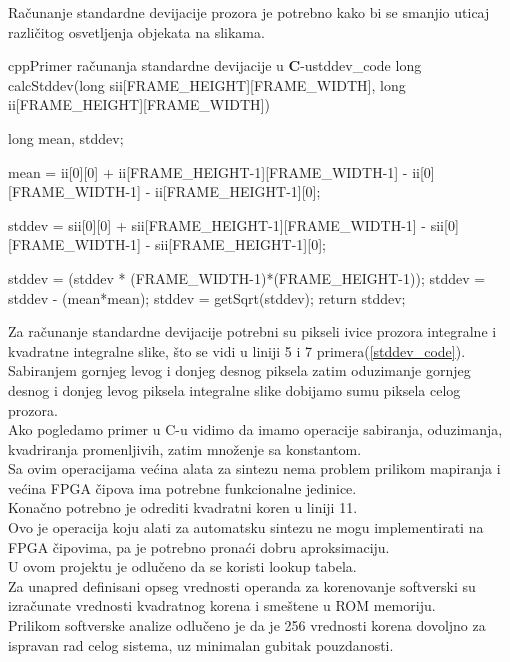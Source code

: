 Računanje standardne devijacije prozora je potrebno kako bi se smanjio uticaj
različitog osvetljenja objekata na slikama.

\begin{code}[H]{cpp}{Primer računanja standardne devijacije u \textbf{C}-u}{stddev_code}
long calcStddev(long sii[FRAME_HEIGHT][FRAME_WIDTH],
                long ii[FRAME_HEIGHT][FRAME_WIDTH]){
  long mean, stddev;

  mean = ii[0][0] + ii[FRAME_HEIGHT-1][FRAME_WIDTH-1] - ii[0][FRAME_WIDTH-1] - ii[FRAME_HEIGHT-1][0];

  stddev = sii[0][0] + sii[FRAME_HEIGHT-1][FRAME_WIDTH-1] - sii[0][FRAME_WIDTH-1] - sii[FRAME_HEIGHT-1][0];

  stddev = (stddev * (FRAME_WIDTH-1)*(FRAME_HEIGHT-1));
  stddev = stddev - (mean*mean);
  stddev = getSqrt(stddev);
  return stddev;
}
\end{code}

Za računanje standardne devijacije potrebni su pikseli ivice prozora integralne i
kvadratne integralne slike, što se vidi u liniji 5 i 7
primera(\ref{stddev_code}). \\
Sabiranjem gornjeg levog i donjeg desnog piksela zatim oduzimanje gornjeg desnog
i donjeg levog piksela integralne slike dobijamo sumu piksela celog prozora. \\
Ako pogledamo primer u C-u vidimo da imamo operacije sabiranja, oduzimanja,
kvadriranja promenljivih, zatim množenje sa konstantom. \\
Sa ovim operacijama većina alata za sintezu nema problem prilikom mapiranja i
većina FPGA čipova ima potrebne funkcionalne jedinice. \\

Konačno potrebno je odrediti kvadratni koren u liniji 11. \\
Ovo je operacija koju alati za automatsku sintezu ne mogu implementirati
na FPGA čipovima, pa je potrebno pronaći dobru aproksimaciju. \\

U ovom projektu je odlučeno da se koristi lookup tabela. \\
Za unapred definisani opseg vrednosti operanda za korenovanje softverski su
izračunate vrednosti kvadratnog korena i smeštene u ROM memoriju. \\
Prilikom softverske analize odlučeno je da je 256 vrednosti korena dovoljno za ispravan
rad celog sistema, uz minimalan gubitak pouzdanosti. \\


